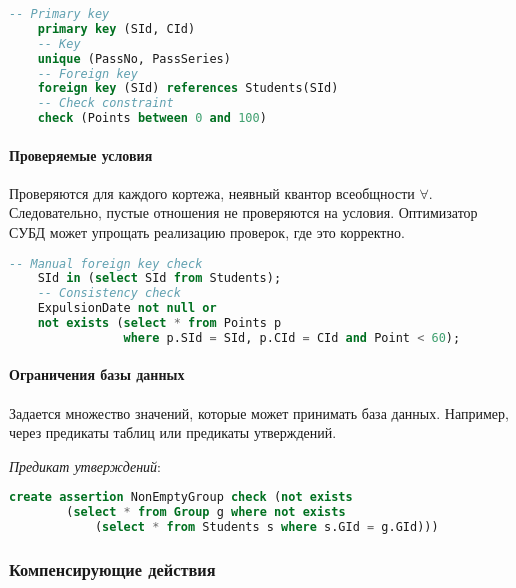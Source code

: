 \begin{examples}
	\enewline
	\begin{lstlisting}[language=SQL]
    -- Primary key
    primary key (SId, CId)
    -- Key
    unique (PassNo, PassSeries)
    -- Foreign key
    foreign key (SId) references Students(SId)
    -- Check constraint
    check (Points between 0 and 100)
    \end{lstlisting}
\end{examples}

\paragraph{Проверяемые условия}

Проверяются для каждого кортежа, неявный квантор всеобщности $\forall$. Следовательно,
пустые отношения не проверяются на условия. Оптимизатор СУБД может упрощать реализацию проверок,
где это корректно.

\begin{examples}
	\enewline
	\begin{lstlisting}[language=SQL]
    -- Manual foreign key check
    SId in (select SId from Students);
    -- Consistency check
    ExpulsionDate not null or
    not exists (select * from Points p
                where p.SId = SId, p.CId = CId and Point < 60);
    \end{lstlisting}
\end{examples}

\paragraph{Ограничения базы данных}

Задается множество значений, которые может принимать база данных. Например, через предикаты таблиц
или предикаты утверждений.

\begin{example}
	\textit{Предикат утверждений}:
	\begin{lstlisting}[language=SQL]
    create assertion NonEmptyGroup check (not exists
        (select * from Group g where not exists
            (select * from Students s where s.GId = g.GId)))
    \end{lstlisting}
\end{example}

\subsubsection{Компенсирующие действия}

